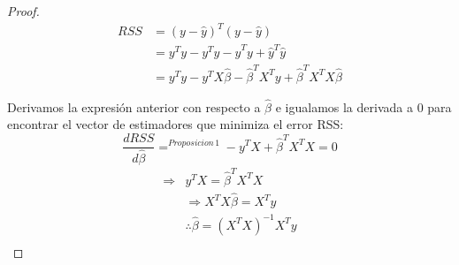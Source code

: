 \documentclass[12pt,a4paper]{book}
\begin{document}
\begin{proof}
\begin{equation*}
\begin{split}
RSS &= (y-\hat{y})^T(y-\hat{y})\\&= y^Ty-y^T\hat{y}-\hat{y}^Ty+\hat{y}^T\hat{y}\\&= y^Ty-y^TX\hat{\beta}-\hat{\beta}^TX^Ty+\hat{\beta}^TX^TX\hat{\beta}
\end{split}
\end{equation*}


Derivamos la expresión anterior con respecto a $\hat{\beta}$ e igualamos la derivada a 0 para encontrar el vector de estimadores que minimiza el error RSS:
$$\frac{dRSS}{d\hat{\beta}}
=^{Proposicion\,1} -y^TX + \hat{\beta}^TX^TX=0$$
\begin{equation*}
\begin{split}
\Rightarrow &y^TX=\hat{\beta}^TX^TX\\&
\Rightarrow X^TX\hat{\beta}=X^Ty \\&
\therefore  \hat{\beta} = (X^TX)^{-1}X^Ty \\
\end{split}
\end{equation*}
\end{proof}
\end{document}
